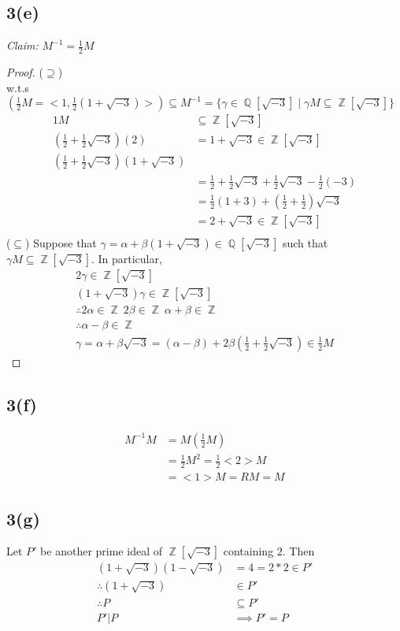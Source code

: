 \documentclass{article}
\DeclareMathOperator{\Z}{\mathbb{Z}}
\DeclareMathOperator{\Q}{\mathbb{Q}}
\begin{document}
\subsection*{3(e)}
\textit{Claim:} $M^{-1}=\frac{1}{2}M$
\begin{proof}
($\supseteq$)\\w.t.s
$(\frac{1}{2}M = <1,\frac{1}{2}(1+\sqrt{-3})>)\subseteq M^{-1}=\{\gamma\in\Q[\sqrt{-3}]\;|\;\gamma M\subseteq\Z[\sqrt{-3}]\}$
\begin{align*}
1M&\subseteq\Z[\sqrt{-3}]\\
(\frac{1}{2}+\frac{1}{2}\sqrt{-3})(2)&=1+\sqrt{-3}\in\Z[\sqrt{-3}]\\
(\frac{1}{2}+\frac{1}{2}\sqrt{-3})(1+\sqrt{-3})&\\
&=\frac{1}{2}+\frac{1}{2}\sqrt{-3}+\frac{1}{2}\sqrt{-3}-\frac{1}{2}(-3)\\
&=\frac{1}{2}(1+3)+(\frac{1}{2}+\frac{1}{2})\sqrt{-3}\\
&=2+\sqrt{-3}\in\Z[\sqrt{-3}]\\
\end{align*}
($\subseteq$) Suppose that $\gamma = \alpha+\beta(1+\sqrt{-3})\in\Q[\sqrt{-3}]$ such that $\gamma M\subseteq\Z[\sqrt{-3}]$.  In particular, \begin{multline*}
2\gamma\in\Z[\sqrt{-3}]\\
(1+\sqrt{-3})\gamma\in\Z[\sqrt{-3}]\\
\therefore 2\alpha\in \Z \ 2\beta\in\Z \ \alpha+\beta\in \Z\\ \therefore \alpha-\beta\in\Z\\ \gamma = \alpha+\beta\sqrt{-3} = (\alpha-\beta) + 2\beta(\frac{1}{2}+\frac{1}{2}\sqrt{-3}) \in \frac{1}{2}M
\end{multline*}
\end{proof}
\subsection*{3(f)}
\begin{align*}
M^{-1}M &= M(\frac{1}{2}M)\\
&= \frac{1}{2}M^2 = \frac{1}{2}<2>M\\
&= <1>M = RM = M
\end{align*}
\subsection*{3(g)}
Let $P'$ be another prime ideal of $\Z[\sqrt{-3}]$ containing $2$.  Then
\begin{align*}
(1+\sqrt{-3})(1-\sqrt{-3}) &= 4 = 2*2\in P'\\
\therefore (1+\sqrt{-3})&\in P'\\
\therefore P&\subseteq P'\\
P'| P &\implies P' = P
\end{align*}
\end{document}
